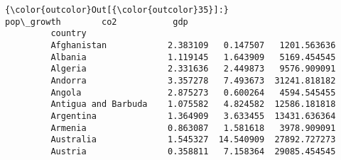 \documentclass[11pt]{article}
\begin{document}
\begin{Verbatim}[commandchars=\\\{\}]
{\color{outcolor}Out[{\color{outcolor}35}]:}                      pop\_growth        co2           gdp
         country                                                 
         Afghanistan            2.383109   0.147507   1201.563636
         Albania                1.119145   1.643909   5169.454545
         Algeria                2.331636   2.449873   9576.909091
         Andorra                3.357278   7.493673  31241.818182
         Angola                 2.875273   0.600264   4594.545455
         Antigua and Barbuda    1.075582   4.824582  12586.181818
         Argentina              1.364909   3.633455  13431.636364
         Armenia                0.863087   1.581618   3978.909091
         Australia              1.545327  14.540909  27892.727273
         Austria                0.358811   7.158364  29085.454545
\end{Verbatim}
            
\end{document}
